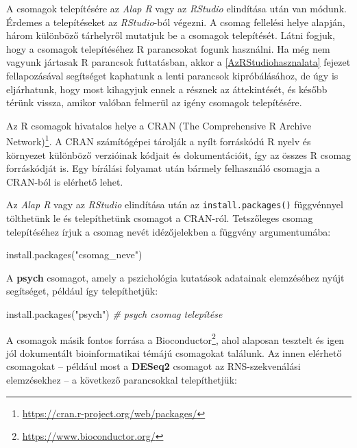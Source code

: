 \documentclass[
]{book}
\newenvironment{Shaded}{\begin{snugshade}}{\end{snugshade}}
\newcommand{\CommentTok}[1]{\textcolor[rgb]{0.56,0.35,0.01}{\textit{#1}}}
\newcommand{\FunctionTok}[1]{\textcolor[rgb]{0.00,0.00,0.00}{#1}}
\newcommand{\NormalTok}[1]{#1}
\newcommand{\StringTok}[1]{\textcolor[rgb]{0.31,0.60,0.02}{#1}}
\DeclareRobustCommand{\href}[2]{#2\footnote{\url{#1}}}
\begin{document}
A csomagok telepítésére az \emph{Alap R} vagy az \emph{RStudio} elindítása után van módunk. Érdemes a telepítéseket az \emph{RStudio}-ból végezni. A csomag fellelési helye alapján, három különböző tárhelyről mutatjuk be a csomagok telepítését. Látni fogjuk, hogy a csomagok telepítéséhez R parancsokat fogunk használni. Ha még nem vagyunk jártasak R parancsok futtatásban, akkor a \ref{AzRStudiohasznalata} fejezet fellapozásával segítséget kaphatunk a lenti parancsok kipróbálásához, de úgy is eljárhatunk, hogy most kihagyjuk ennek a résznek az áttekintését, és később térünk vissza, amikor valóban felmerül az igény csomagok telepítésére.

Az R csomagok hivatalos helye a \href{https://cran.r-project.org/web/packages/}{CRAN (The Comprehensive R Archive Network)}. A CRAN számítógépei tárolják a nyílt forráskódú R nyelv és környezet különböző verzióinak kódjait és dokumentációit, így az összes R csomag forráskódját is. Egy bírálási folyamat után bármely felhasználó csomagja a CRAN-ból is elérhető lehet.

Az \emph{Alap R} vagy az \emph{RStudio} elindítása után az \texttt{install.packages()} függvénnyel tölthetünk le és telepíthetünk csomagot a CRAN-ról. Tetszőleges csomag telepítéséhez írjuk a csomag nevét idézőjelekben a függvény argumentumába:

\begin{Shaded}
\begin{Highlighting}[]
\NormalTok{install.packages("csomag\_neve")}
\end{Highlighting}
\end{Shaded}

A \textbf{psych} csomagot, amely a pszichológia kutatások adatainak elemzéséhez nyújt segítséget, például így telepíthetjük:

\begin{Shaded}
\begin{Highlighting}[]
\FunctionTok{install.packages}\NormalTok{(}\StringTok{"psych"}\NormalTok{)        }\CommentTok{\# psych csomag telepítése}
\end{Highlighting}
\end{Shaded}

A csomagok másik fontos forrása a \href{https://www.bioconductor.org/}{Bioconductor}, ahol alaposan tesztelt és igen jól dokumentált bioinformatikai témájú csomagokat találunk. Az innen elérhető csomagokat -- például most a \textbf{DESeq2} csomagot az RNS-szekvenálási elemzésekhez -- a következő parancsokkal telepíthetjük:
\end{document}
